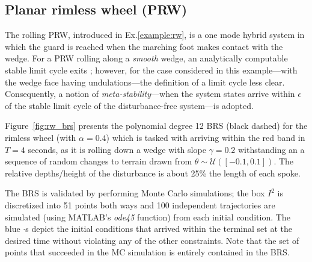 \subsection{Planar rimless wheel (PRW)}
The rolling PRW, introduced in Ex.\ref{example:rw}, is a one mode hybrid system in which the guard is reached when the marching foot makes contact with the wedge. For a PRW rolling along a {\em smooth} wedge, an analytically computable stable limit cycle exits \cite{Coleman1998}; however, for the case considered in this example---with the wedge face having undulations---the definition of a limit cycle less clear. Consequently, a notion of {\em meta-stability}---when the system states arrive within $\epsilon$ of the stable limit cycle of the disturbance-free system---is adopted.
\par
Figure~\ref{fig:rw_brs} presents the polynomial degree 12 BRS (black dashed) for the rimless wheel (with $\alpha=0.4$) which is tasked with arriving within the red band in $T=4$ seconds, as it is rolling down a wedge with slope $\gamma=0.2$ withstanding an a sequence of random changes to terrain drawn from $\theta\sim\mathcal U([-0.1,0.1])$. The relative depths/height of the disturbance is about 25\% the length of each spoke.
\par
The BRS is validated by performing Monte Carlo simulations; the box $I^2$ is discretized into 51 points both ways and 100 independent trajectories are simulated (using MATLAB's {\em ode45} function) from each initial condition. The blue $\cdot$s depict the initial conditions that arrived within the terminal set at the desired time without violating any of the other constraints. Note that the set of points that succeeded in the MC simulation is entirely contained in the BRS.

